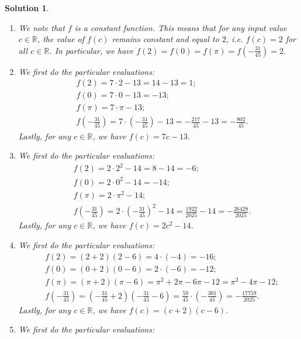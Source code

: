 \documentclass[12pt]{article}
\newtheorem{sol}[prop]{Solution}
\begin{document}
\begin{sol}
\begin{enumerate}
\item[a)] We note that $f$ is a constant function. This means that for any input value $c\in \mathbb{R}$, the value of $f(c)$ remains constant and equal to $2$, i.e. $f(c)=2$ for all $c\in \mathbb{R}$. In particular, we have $f(2)=f(0)=f(\pi)=f(-\frac{31}{45})=2$.
\item[b)] We first do the particular evaluations:
\begin{equation*}
\begin{split}
& f(2)=7\cdot 2-13=14-13=1;\\
& f(0)=7\cdot 0-13=-13;\\
& f(\pi)=7\cdot \pi-13;\\
& f(-\frac{31}{45})=7\cdot (-\frac{31}{45})-13=-\frac{217}{45}-13=-\frac{802}{45}.
\end{split}
\end{equation*}
Lastly, for any $c\in \mathbb{R}$, we have $f(c)=7c-13$.
\item[c)] We first do the particular evaluations:
\begin{equation*}
\begin{split}
& f(2)=2\cdot 2^{2}-14=8-14=-6;\\
& f(0)=2\cdot 0^{2}-14=-14;\\
& f(\pi)=2\cdot \pi^{2}-14;\\
& f(-\frac{31}{45})=2\cdot (-\frac{31}{45})^{2}-14=\frac{1922}{2025}-14=-\frac{26428}{2025}.
\end{split}
\end{equation*}
Lastly, for any $c\in \mathbb{R}$, we have $f(c)=2c^{2}-14$.
\item[d)] We first do the particular evaluations:
\begin{equation*}
\begin{split}
& f(2)=(2+2)(2-6)=4\cdot (-4)=-16;\\
& f(0)=(0+2)(0-6)=2\cdot (-6)=-12;\\
& f(\pi)=(\pi+2)(\pi-6)=\pi^{2}+2\pi-6\pi-12=\pi^{2}-4\pi-12;\\
& f(-\frac{31}{45})=(-\frac{31}{45}+2)(-\frac{31}{45}-6)=\frac{59}{45}\cdot (-\frac{301}{45})=-\frac{17759}{2025}.
\end{split}
\end{equation*}
Lastly, for any $c\in \mathbb{R}$, we have $f(c)=(c+2)(c-6)$.
\item[e)] We first do the particular evaluations:
\begin{equation*}

\end{equation*}
\end{enumerate}
\end{sol}
\end{document}
